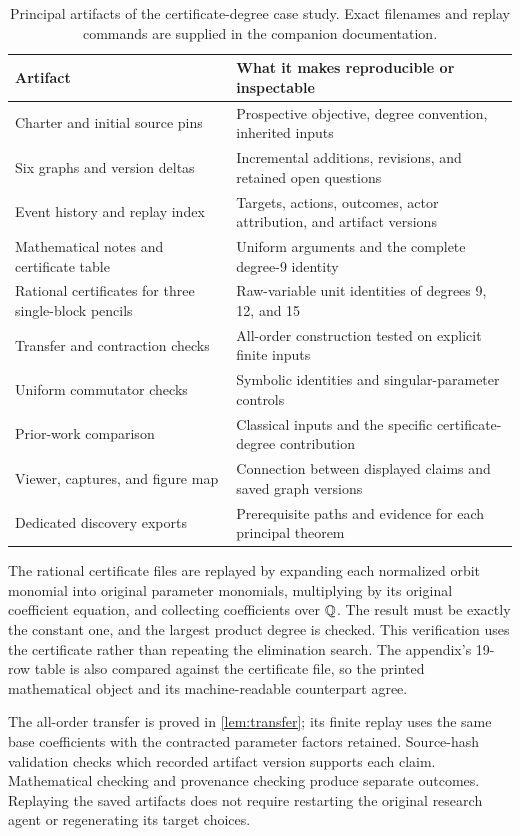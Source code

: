 \begin{table}[htbp]
\centering\small
\begin{tabularx}{\linewidth}{@{}p{5.0cm}Y@{}}
\toprule
Artifact & What it makes reproducible or inspectable \\
\midrule
Charter and initial source pins & Prospective objective, degree convention, inherited inputs \\
Six graphs and version deltas & Incremental additions, revisions, and retained open questions \\
Event history and replay index & Targets, actions, outcomes, actor attribution, and artifact versions \\
Mathematical notes and certificate table & Uniform arguments and the complete degree-9 identity \\
Rational certificates for three single-block pencils & Raw-variable unit identities of degrees 9, 12, and 15 \\
Transfer and contraction checks & All-order construction tested on explicit finite inputs \\
Uniform commutator checks & Symbolic identities and singular-parameter controls \\
Prior-work comparison & Classical inputs and the specific certificate-degree contribution \\
Viewer, captures, and figure map & Connection between displayed claims and saved graph versions \\
Dedicated discovery exports & Prerequisite paths and evidence for each principal theorem \\
\bottomrule
\end{tabularx}
\caption{Principal artifacts of the certificate-degree case study. Exact filenames and replay commands are supplied in the companion documentation.}
\end{table}

The rational certificate files are replayed by expanding each normalized orbit monomial into original parameter monomials, multiplying by its original coefficient equation, and collecting coefficients over $\mathbb{Q}$. The result must be exactly the constant one, and the largest product degree is checked. This verification uses the certificate rather than repeating the elimination search. The appendix's 19-row table is also compared against the certificate file, so the printed mathematical object and its machine-readable counterpart agree.

The all-order transfer is proved in \cref{lem:transfer}; its finite replay uses the same base coefficients with the contracted parameter factors retained. Source-hash validation checks which recorded artifact version supports each claim. Mathematical checking and provenance checking produce separate outcomes. Replaying the saved artifacts does not require restarting the original research agent or regenerating its target choices.

